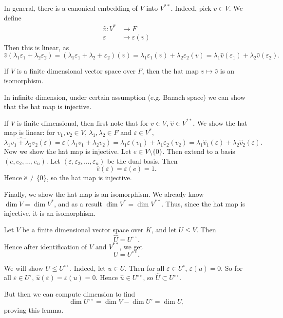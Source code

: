 \documentclass[12pt]{article}
\begin{document}
In general, there is a canonical embedding of $V$ into $V^{\ast \ast}$. Indeed, pick $v \in V$. We define
\begin{align*}
	\hat v : V^{\ast} &\to F \\
	\varepsilon &\mapsto \varepsilon(v)
\end{align*}
Then this is linear, as
\[
	\hat v(\lambda_1 \varepsilon_1 + \lambda_2 \varepsilon_2) = (\lambda_1 \varepsilon_1 + \lambda_2 + \varepsilon_2)(v) = \lambda_1 \varepsilon_1(v) + \lambda_2 \varepsilon_2(v) = \lambda_1 \hat v(\varepsilon_1) + \lambda_2 \hat v(\varepsilon_2)
.\]

\begin{theorem}
	If $V$ is a finite dimensional vector space over $F$, then the hat map $v \mapsto \hat v$ is an isomorphism.
\end{theorem}

In infinite dimension, under certain assumption (e.g. Banach space) we can show that the hat map is injective.

\begin{proofbox}
	If $V$ is finite dimensional, then first note that for $v \in V$, $\hat v \in V^{\ast \ast}$. We show the hat map is linear: for $v_1, v_2 \in V$, $\lambda_1, \lambda_2 \in F$ and $\varepsilon \in V^{\ast}$,
	\[
		\widehat{\lambda_1 v_1 + \lambda_2 v_2} (\varepsilon) = \varepsilon(\lambda_1 v_1 + \lambda_2 v_2) = \lambda_1 \varepsilon(v_1) + \lambda_1 \varepsilon_2(v_2) = \lambda_1 \hat v_1(\varepsilon) + \lambda_2 \hat v_2 (\varepsilon)
	.\]
	Now we show the hat map is injective. Let $e \in V \setminus \{0\}$. Then extend to a basis $(e, e_2, \ldots, e_n)$. Let $(\varepsilon, \varepsilon_2, \ldots, \varepsilon_n)$ be the dual basis. Then
	\[
		\hat e (\varepsilon) = \varepsilon(e) = 1
	.\]
	Hence $\hat e \neq \{0\}$, so the hat map is injective.

	Finally, we show the hat map is an isomorphism. We already know $\dim V = \dim V^{\ast}$, and as a result $\dim V^{\ast} = \dim V^{\ast \ast}$. Thus, since the hat map is injective, it is an isomorphism.
\end{proofbox}

\begin{lemma}
	Let $V$ be a finite dimensional vector space over $K$, and let $U \leq V$. Then
	\[
	\hat U = U^{\circ \circ}
	.\]
	Hence after identification of $V$ and $V^{\ast \ast}$, we get
	\[
	U = U^{\circ \circ}
	.\]
\end{lemma}

\begin{proofbox}
	We will show $U \leq U^{\circ \circ}$. Indeed, let $u \in U$. Then for all $\varepsilon \in U^{\circ}$, $\varepsilon(u) = 0$. So for all $\varepsilon \in U^{\circ}$, $\hat u(\varepsilon) = \varepsilon(u) = 0$. Hence $\hat u \in U^{\circ \circ}$, so $\hat U \subset U^{\circ \circ}$.

	But then we can compute dimension to find
	\[
	\dim U^{\circ \circ} = \dim V - \dim U^{\circ} = \dim U
	,\]
	proving this lemma.
\end{proofbox}
\end{document}
